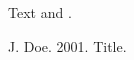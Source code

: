 \documentclass{article}
\begin{document}
Text \citep{k} and \citet{k}.

\begin{thebibliography}{}
 J. Doe. 2001. Title.
\end{thebibliography}
\end{document}
